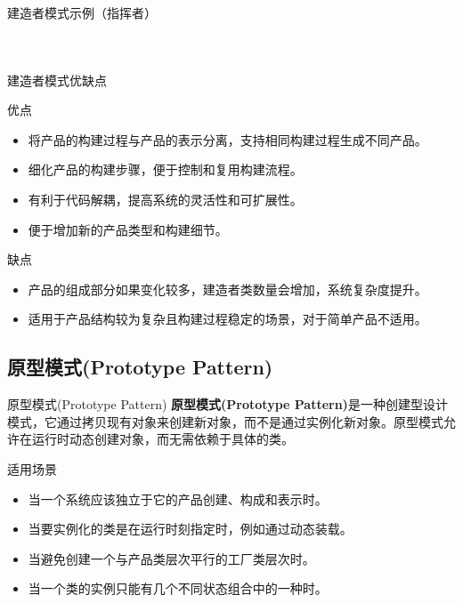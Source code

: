 \documentclass[UTF8,aspectratio=169]{beamer}
\begin{document}
\begin{frame}{建造者模式示例（指挥者）}
    \begin{columns}
        \begin{column}{0.48\textwidth}
            \inputminted[firstline=201, lastline=219]{cpp}{code/builder_pattern.cpp}
        \end{column}
        \begin{column}{0.48\textwidth}
            \inputminted[firstline=220, lastline=236]{cpp}{code/builder_pattern.cpp}
        \end{column}
    \end{columns}
\end{frame}

\begin{frame}{建造者模式优缺点}
    \begin{ytublock}{优点}
        \begin{itemize}
            \item 将产品的构建过程与产品的表示分离，支持相同构建过程生成不同产品。
            \item 细化产品的构建步骤，便于控制和复用构建流程。
            \item 有利于代码解耦，提高系统的灵活性和可扩展性。
            \item 便于增加新的产品类型和构建细节。
        \end{itemize}
    \end{ytublock}
    \begin{alertytublock}{缺点}
        \begin{itemize}
            \item 产品的组成部分如果变化较多，建造者类数量会增加，系统复杂度提升。
            \item 适用于产品结构较为复杂且构建过程稳定的场景，对于简单产品不适用。
        \end{itemize}
    \end{alertytublock}
\end{frame}

\subsection{原型模式(Prototype Pattern)}

\begin{frame}{原型模式(Prototype Pattern)}
    \textbf{原型模式(Prototype Pattern)}是一种创建型设计模式，它通过拷贝现有对象来创建新对象，而不是通过实例化新对象。原型模式允许在运行时动态创建对象，而无需依赖于具体的类。
    \begin{ytublock}{适用场景}
        \begin{itemize}
            \item 当一个系统应该独立于它的产品创建、构成和表示时。
            \item 当要实例化的类是在运行时刻指定时，例如通过动态装载。
            \item 当避免创建一个与产品类层次平行的工厂类层次时。
            \item 当一个类的实例只能有几个不同状态组合中的一种时。
        \end{itemize}
    \end{ytublock}
\end{frame}
\end{document}
